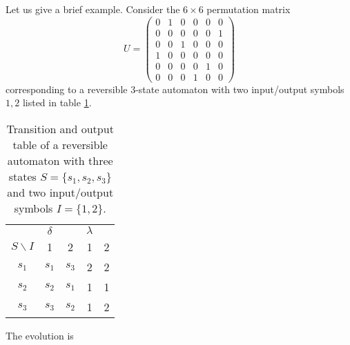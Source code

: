 Let us give a brief example. Consider the $6\times 6$ permutation matrix
$$
U=
\left(
\begin{array}{cccccc}
0&1&0&0&0&0\\
0&0&0&0&0&1\\
0&0&1&0&0&0\\
1&0&0&0&0&0\\
0&0&0&0&1&0\\
0&0&0&1&0&0
\end{array}
\right)
$$
corresponding to a reversible $3$-state automaton with two input/output
symbols $1,2$
listed in table
\ref{t-rra}.
\begin{table}
\begin{center}
\begin{tabular}{|c|cc|cc|}
 \hline
 \hline
 &$\delta$ & & $\lambda$&\\
$S\backslash I$ &1&2& 1&2\\
 \hline
$s_1$&$s_1$&$s_3$ & 2&2\\
$s_2$&$s_2$&$s_1 $& 1&1\\
$s_3$&$s_3$&$s_2 $& 1&2\\
 \hline
 \hline
\end{tabular}
\end{center}
\caption{Transition and output table of a reversible
automaton with three states $S=\{s_1, s_2, s_3\}$ and two input/output
symbols $I= \{1,2\}$.\label{t-rra}}
\end{table}
The evolution is
